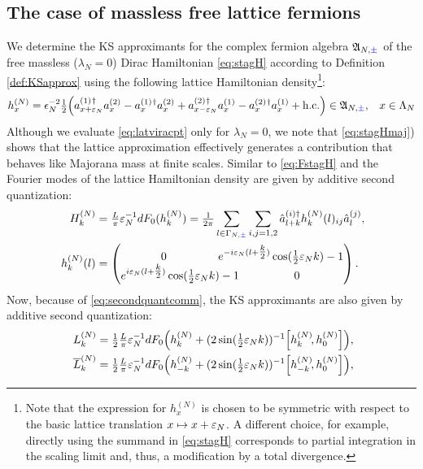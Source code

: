 \documentclass[a4paper, 11pt]{article}
\newcommand{\fA}{\mathfrak{A}}\newcommand{\cA}{\mathcal{A}}\newcommand{\dA}{\mathds{A}}\newcommand{\sA}{\mathscr{A}}
\DeclareMathOperator{\1}{\mathds{1}}
\begin{document}
\subsection{The case of massless free lattice fermions}
\label{sec:ffKS}
We determine the KS approximants for the complex fermion algebra $\fA_{N,{\color{blue}\pm}}$ of the free massless ($\lambda_{N}=0$) Dirac Hamiltonian \eqref{eq:stagH} according to Definition \ref{def:KSapprox} using the following lattice Hamiltonian density\footnote{Note that the expression for $h^{(N)}_{x}$ is chosen to be symmetric with respect to the basic lattice translation $x\mapsto x+\varepsilon_{N}$. A different choice, for example, directly using the summand in \eqref{eq:stagH} corresponds to partial integration in the scaling limit and, thus, a modification by a total divergence.}:
\begin{align}
\label{eq:lathdfermisym}
h^{(N)}_{x} & = \epsilon_{N}^{-2}\tfrac{1}{2}\Big(a^{(1)\!\!\ \dagger}_{x+\vep_{N}}a^{(2)}_{x} - a^{(1)\!\!\ \dagger}_{x}a^{(2)}_{x} +a^{(2)\!\!\ \dagger}_{x-\vep_{N}}a^{(1)}_{x} - a^{(2)\!\!\ \dagger}_{x}a^{(1)}_{x} + \textup{h.c.}\Big)\in\fA_{N,{\color{blue}\pm}}, & x\in\Lambda_{N}
\end{align}
Although we evaluate \eqref{eq:latviracpt} only for $\lambda_{N}=0$, we note that \eqref{eq:stagHmaj}) shows that the lattice approximation effectively generates a contribution that behaves like Majorana mass at finite scales. Similar to  \eqref{eq:FstagH} and the Fourier modes of the lattice Hamiltonian density are given by additive second quantization:
\begin{align}
\label{eq:Flathdfermisym}
H^{(N)}_{k} & = \tfrac{L}{\pi}\vep_{N}^{-1}dF_{0}(h^{(N)}_{k}) = \tfrac{1}{2\pi}\sum_{l\in\Gamma_{N,{\color{blue}\pm}}}\sum_{i,j=1,2}\hat{a}^{(i)\dag}_{l+k}h^{(N)}_{k}(l)_{ij}\hat{a}^{(j)}_{l}, \\ \nonumber
h^{(N)}_{k}(l) & = \begin{pmatrix}\hspace{-1cm} 0 & \hspace{-1cm} e^{-i\vep_{N}(l+\tfrac{k}{2})}\cos(\tfrac{1}{2}\vep_{N}k)-1 \\ e^{i\vep_{N}(l+\tfrac{k}{2})}\cos(\tfrac{1}{2}\vep_{N}k)-1 & 0 \end{pmatrix}.
\end{align}
Now, because of \eqref{eq:secondquantcomm}, the KS approximants are also given by additive second quantization:
\begin{align}
\label{eq:latviraSQ}
L_{k}^{(N)} & = \tfrac{1}{2}\tfrac{L}{\pi}\vep_{N}^{-1}dF_{0}\Big(h_{k}^{(N)}+(2\sin(\tfrac{1}{2}\vep_{N}k))^{-1}\Big[h_{k}^{(N)}\!,h^{(N)}_{0}\Big]\Big), \\ \nonumber
\overline{L}_{k}^{(N)} & = \tfrac{1}{2}\tfrac{L}{\pi}\vep_{N}^{-1}dF_{0}\Big(h_{-k}^{(N)}+(2\sin(\tfrac{1}{2}\vep_{N}k))^{-1}\Big[h_{-k}^{(N)}\!,h^{(N)}_{0}\Big]\Big),
\end{align}
\end{document}
